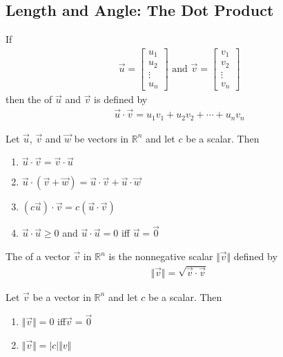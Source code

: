 \documentclass{article}
\begin{document}
\subsection{Length and Angle: The Dot Product}
\begin{definition}
    If
    \begin{gather*}
        \vec u = \begin{bmatrix}
            u_1\\u_2\\\vdots\\u_n
        \end{bmatrix} \text{  and  }
        \vec v = \begin{bmatrix}
            v_1\\v_2\\\vdots\\v_n
        \end{bmatrix}
    \end{gather*}
    then the  of $\vec u$ and $\vec v$ is defined by
    \begin{gather*}
        \vec u \cdot \vec v = u_1v_1 + u_2v_2 + \cdots + u_nv_n
    \end{gather*} 
\end{definition}
\begin{theorem}
    Let $\vec u$, $\vec v$ and $\vec w$ be vectors in $\mathbb{R}^n$ and let $c$ be a scalar. Then
    \begin{enumerate}
        \item $\vec u \cdot \vec v = \vec v \cdot \vec u$
        \item $\vec u \cdot (\vec v + \vec w) = \vec u \cdot \vec v + \vec u \cdot \vec w$
        \item $(c\vec u) \cdot \vec v = c(\vec u \cdot \vec v)$
        \item $\vec u \cdot \vec u \geq 0$ and $\vec u \cdot \vec u = 0$ iff $\vec u = \vec 0$
    \end{enumerate}
\end{theorem}
\begin{definition}
    The  of a vector $\vec v$ in $\mathbb{R}^n$ is the nonnegative scalar $\Vert\vec v\Vert$ defined by
    \begin{gather*}
        \Vert\vec v\Vert = \sqrt{\vec v \cdot \vec v}
    \end{gather*}
\end{definition}
\begin{theorem}
    Let $\vec v$ be a vector in $\mathbb{R}^n$ and let $c$ be a scalar. Then
    \begin{enumerate}
        \item $\Vert\vec v\Vert = 0$ iff$\vec v = \vec 0$
        \item $\Vert\vec v\Vert = |c|\Vert v\Vert$
    \end{enumerate}
\end{theorem}
\end{document}
